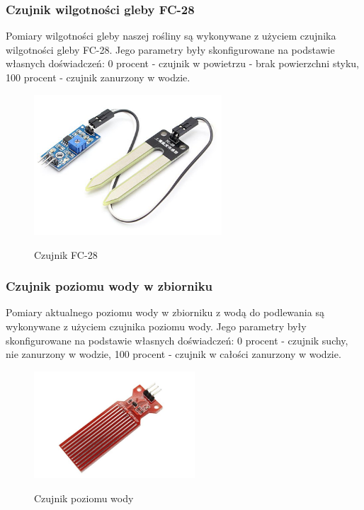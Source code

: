 \documentclass[12pt]{article}
\begin{document}
\subsubsection{Czujnik wilgotności gleby FC-28}
Pomiary wilgotności gleby naszej rośliny są wykonywane z użyciem czujnika wilgotności gleby FC-28. Jego parametry były skonfigurowane na podstawie własnych doświadczeń: 0 procent - czujnik w powietrzu - brak powierzchni styku, 100 procent - czujnik zanurzony w wodzie.

\begin{figure}[!h]
	\begin{center}
		{\includegraphics[width=7cm]{FC-28_photo.png}}
	\end{center}
	\caption{Czujnik FC-28}
\end{figure}

\newpage
\subsubsection{Czujnik poziomu wody w zbiorniku}
Pomiary aktualnego poziomu wody w zbiorniku z wodą do podlewania są wykonywane z użyciem czujnika poziomu wody. Jego parametry były skonfigurowane na podstawie własnych doświadczeń: 0 procent - czujnik suchy, nie zanurzony w wodzie, 100 procent - czujnik w całości zanurzony w wodzie.
\begin{figure}[!h]
	\begin{center}
		{\includegraphics[width=6cm]{water_sensor_photo.png}}
	\end{center}
	\caption{Czujnik poziomu wody}
\end{figure}
\end{document}
